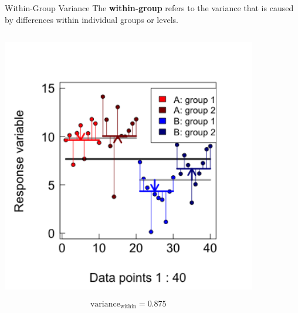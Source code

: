 \documentclass{beamer}
\begin{document}
\begin{frame}{Within-Group Variance}
  \footnotesize{The \textbf{within-group} refers to the variance that is caused by differences within individual groups or levels.}
  
  \begin{columns}[onlytextwidth] 
  \begin{column}{0.5\textwidth}
  \begin{center}
        \includegraphics[width=0.999\textwidth]{lectures/day_1_intro_to_mems/figures/unnamed-chunk-30-1.png}
      \end{center}
      \[ \text{variance}_{\text{within}} = 0.875 \]
  \end{column}
    \hspace{0.02\textwidth} %
    \begin{column}{0.5\textwidth}
      \begin{center}

\end{center}
\end{column}
\end{columns}
\end{frame}
\end{document}
